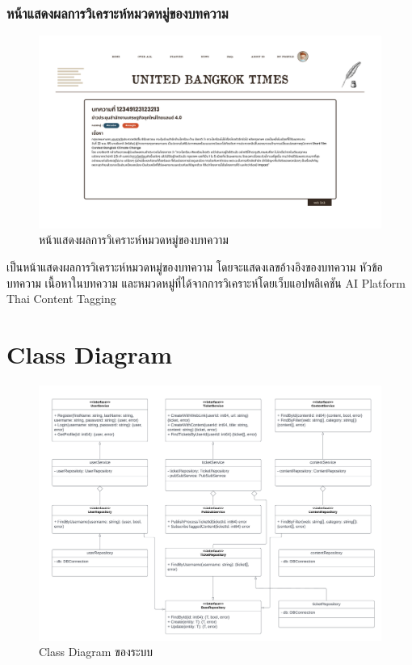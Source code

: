 \documentclass[12pt,oneside,openright,a4paper]{cpe-thai-project}
\begin{document}
\begin{itemize}
\subsubsection{หน้าแสดงผลการวิเคราะห์หมวดหมู่ของบทความ}
\begin{figure}[!ht]\centering
  \includegraphics[width=15cm]{./img/project_ui/12.png} 
  \caption{หน้าแสดงผลการวิเคราะห์หมวดหมู่ของบทความ}\label{fig:result} 
\end{figure} 
\hspace*{1cm}เป็นหน้าแสดงผลการวิเคราะห์หมวดหมู่ของบทความ โดยจะแสดงเลขอ้างอิงของบทความ หัวข้อบทความ เนื้อหาในบทความ 
และหมวดหมู่ที่ได้จากการวิเคราะห์โดยเว็บแอปพลิเคชัน AI Platform Thai Content Tagging 

\section{Class Diagram}
\begin{figure}[!ht]\centering
  \includegraphics[width=13 cm]{./img/class_dia.png} 
  \caption{Class Diagram ของระบบ}\label{fig:class_diagram} 
\end{figure} 


\end{itemize}
\end{document}
